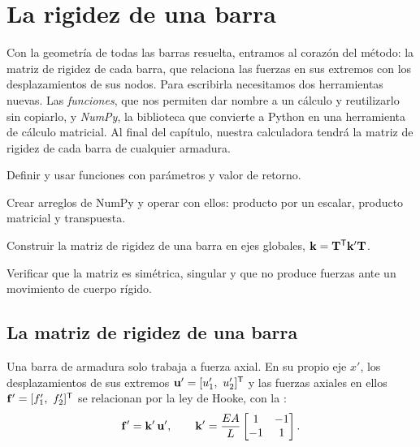 \chapter{La rigidez de una barra}\label{cap:rigidez_barra}

Con la geometría de todas las barras resuelta, entramos al corazón del
método: la matriz de rigidez de cada barra, que relaciona las fuerzas en sus
extremos con los desplazamientos de sus nodos. Para escribirla necesitamos
dos herramientas nuevas. Las \emph{funciones}, que nos permiten dar nombre a
un cálculo y reutilizarlo sin copiarlo, y \emph{NumPy}, la biblioteca que
convierte a Python en una herramienta de cálculo matricial. Al final del
capítulo, nuestra calculadora tendrá la matriz de rigidez de cada barra de
cualquier armadura.

\begin{objetivos}
  \item Definir y usar funciones con parámetros y valor de retorno.
  \item Crear arreglos de NumPy y operar con ellos: producto por un escalar,
    producto matricial y transpuesta.
  \item Construir la matriz de rigidez de una barra en ejes globales,
    $\mathbf{k} = \mathbf{T}^\mathsf{T}\mathbf{k}'\mathbf{T}$.
  \item Verificar que la matriz es simétrica, singular y que no produce
    fuerzas ante un movimiento de cuerpo rígido.
\end{objetivos}

\section{La matriz de rigidez de una barra}\label{sec:teoria_rigidez}

Una barra de armadura solo trabaja a fuerza axial. En su propio eje $x'$,
los desplazamientos de sus extremos $\mathbf{u}' = [u'_1,\ u'_2]^\mathsf{T}$ y las
fuerzas axiales en ellos $\mathbf{f}' = [f'_1,\ f'_2]^\mathsf{T}$ se relacionan por la
ley de Hooke, con la :
\begin{equation}\label{eq:rigidez_local}
  \mathbf{f}' = \mathbf{k}'\,\mathbf{u}', \qquad
  \mathbf{k}' = \frac{EA}{L} \begin{bmatrix} 1 & -1 \\ -1 & 1 \end{bmatrix}.
\end{equation}

